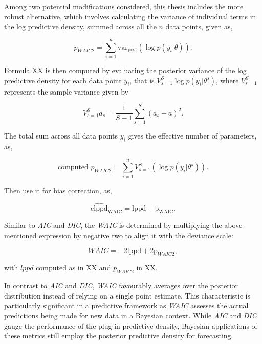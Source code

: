 \documentclass[
  11pt,
]{article}
\begin{document}
Among two potential modifications considered, this thesis includes the
more robust alternative, which involves calculating the variance of
individual terms in the log predictive density, summed across all the
\(n\) data points, given as,

\begin{equation}
p_{WAIC2} = \sum_{i=1}^{n} \text{var}_{\text{post}}(\log p(y_i|\theta)).
\end{equation}

Formula XX is then computed by evaluating the posterior variance of the
log predictive density for each data point \(y_i\), that is
\(V_{s=1}^{S}\log p(y_i|\theta^s)\), where \(V_{s=1}^S\) represents the
sample variance given by

\begin{equation}
V_{s=1}^{S}a_s = \frac{1}{S-1}\sum_{s=1}^{S} (a_s - \bar{a})^2.
\end{equation}

The total sum across all data points \(y_i\) gives the effective number
of parameters, as,

\begin{equation}
\text{computed } p_{WAIC2} = \sum_{i=1}^{n} V_{s=1}^{S} (\log p(y_i |\theta^s)).
\end{equation}

Then use it for bias correction, as,

\begin{equation}
\widehat{\text{elppd}}_{\text{WAIC}} = \text{lppd} - \text{p}_{\text{WAIC}}.
\end{equation}

Similar to \emph{AIC} and \emph{DIC}, the \emph{WAIC} is determined by
multiplying the above-mentioned expression by negative two to align it
with the deviance scale:

\begin{equation}
WAIC = -2\text{lppd} + 2\text{p}_{WAIC2},
\end{equation}

with \(lppd\) computed as in XX and \(p_{WAIC2}\) in XX.

In contrast to \emph{AIC} and \emph{DIC}, \emph{WAIC} favourably
averages over the posterior distribution instead of relying on a single
point estimate. This characteristic is particularly significant in a
predictive framework as \emph{WAIC} assesses the actual predictions
being made for new data in a Bayesian context. While \emph{AIC} and
\emph{DIC} gauge the performance of the plug-in predictive density,
Bayesian applications of these metrics still employ the posterior
predictive density for forecasting.
\end{document}
